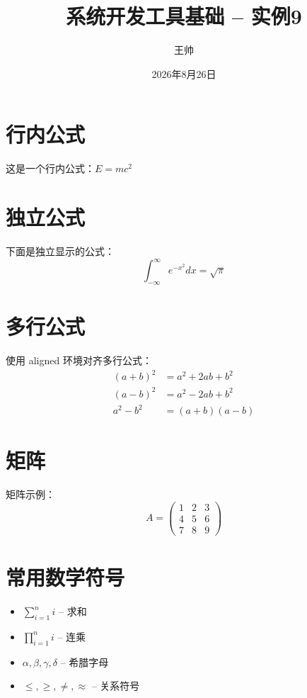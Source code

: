 \documentclass[12pt,a4paper]{article}
\title{系统开发工具基础 -- 实例9}
\author{王帅}
\date{2026年8月26日}
\begin{document}
\maketitle

\section{行内公式}
这是一个行内公式：$E = mc^2$

\section{独立公式}
下面是独立显示的公式：
$$
\int_{-\infty}^{\infty} e^{-x^2} dx = \sqrt{\pi}
$$

\section{多行公式}
使用 aligned 环境对齐多行公式：
\begin{align}
    (a+b)^2 &= a^2 + 2ab + b^2 \\
    (a-b)^2 &= a^2 - 2ab + b^2 \\
    a^2 - b^2 &= (a+b)(a-b)
\end{align}

\section{矩阵}
矩阵示例：
$$
A = \begin{pmatrix}
    1 & 2 & 3 \\
    4 & 5 & 6 \\
    7 & 8 & 9
\end{pmatrix}
$$

\section{常用数学符号}
\begin{itemize}
    \item $\sum_{i=1}^{n} i$ -- 求和
    \item $\prod_{i=1}^{n} i$ -- 连乘
    \item $\alpha, \beta, \gamma, \delta$ -- 希腊字母
    \item $\leq, \geq, \neq, \approx$ -- 关系符号
\end{itemize}
\end{document}
